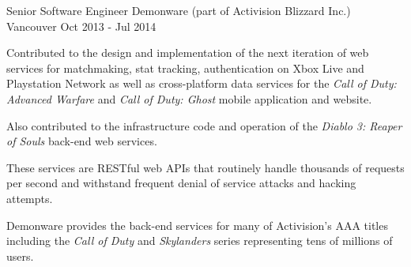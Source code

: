 \begin{cventries}

  \cventrywithsummary
    {Senior Software Engineer} %
    {Demonware (part of Activision Blizzard Inc.)} %
    {Vancouver} %
    {Oct 2013 - Jul 2014} %
    {
      \begin{cvitems} %
        \item {Contributed to the design and implementation of the next iteration of web services for matchmaking, stat tracking, authentication on Xbox Live and Playstation Network as well as cross-platform data services for the \textit{Call of Duty: Advanced Warfare} and \textit{Call of Duty: Ghost} mobile application and website.}
        \item {Also contributed to the infrastructure code and operation of the \textit{Diablo 3: Reaper of Souls} back-end web services.}
        \item {These services are RESTful web APIs that routinely handle thousands of requests per second and withstand frequent denial of service attacks and hacking attempts.}
      \end{cvitems}
    }
    {
      Demonware provides the back-end services for many of Activision's AAA titles including the \textit{Call of Duty} and \textit{Skylanders} series representing tens of millions of users.
    }


\end{cventries}
